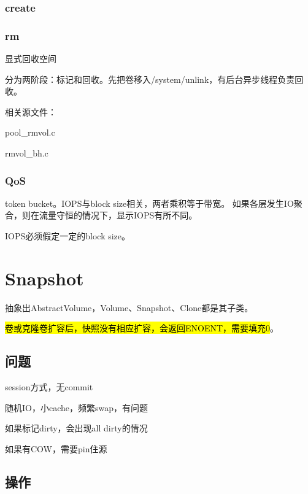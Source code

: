 \subsection{create}

\subsection{rm}

显式回收空间

分为两阶段：标记和回收。先把卷移入/system/unlink，有后台异步线程负责回收。

相关源文件：
\begin{compactitem}
\item pool\_rmvol.c
\item rmvol\_bh.c
\end{compactitem}


\subsection{QoS}

token bucket。IOPS与block size相关，两者乘积等于带宽。
如果各层发生IO聚合，则在流量守恒的情况下，显示IOPS有所不同。

IOPS必须假定一定的block size。

\chapter{Snapshot}

抽象出AbstractVolume，Volume、Snapshot、Clone都是其子类。

\hl{卷或克隆卷扩容后，快照没有相应扩容，会返回ENOENT，需要填充0}。

\section{问题}

\begin{enumbox}
\item session方式，无commit
\item 随机IO，小cache，频繁swap，有问题
\item 如果标记dirty，会出现all dirty的情况
\item 如果有COW，需要pin住源
\end{enumbox}

\section{操作}


